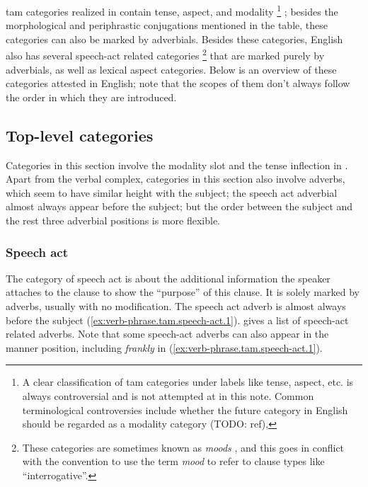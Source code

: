 \documentclass[UTF8, a4paper, oneside, scheme=plain, 12pt]{ctexbook}
\newcommand*{\citesec}[1]{\S~{#1}}
\newcommand*{\citechap}[1]{Ch.~{#1}}
\newcommand*{\term}[1]{\emph{#1}}
\newcommand{\form}[1]{\emph{#1}}
\begin{document}
\ac{tam} categories realized in  
contain tense, aspect, and modality%
\footnote{
    A clear classification of \ac{tam} categories under labels like tense, aspect, etc. 
    is always controversial and is not attempted at in this note.
    Common terminological controversies include 
    whether the future category in English 
    should be regarded as a modality category (TODO: ref),
}
; besides the morphological and periphrastic conjugations mentioned in the table,
these categories can also be marked by adverbials.
Besides these categories,
English also has several speech-act related categories%
\footnote{
    These categories are sometimes known as \term{moods} \citep{cinque1999adverbs},
    and this goes in conflict with 
    the convention to use the term \term{mood}
    to refer to clause types like ``interrogative''. 
}
that are marked purely by adverbials,
as well as lexical aspect categories.
Below is an overview of these categories attested in English;
note that the scopes of them don't always follow the order in which they are introduced.


\subsection{Top-level categories}

Categories in this section involve the 
modality slot and the tense inflection in .
Apart from the verbal complex,
categories in this section also involve adverbs,
which seem to have similar height 
with the subject; 
the speech act adverbial almost always appear before the subject;
but the order between the subject and the rest three adverbial positions 
is more flexible.

\subsubsection{Speech act}

The category of speech act 
is about the additional information the speaker attaches to the clause 
to show the ``purpose'' of this clause.
It is solely marked by adverbs,
usually with no modification.
The speech act adverb is almost always before the subject
(\ref{ex:verb-phrase.tam.speech-act.1}).
\citet[\citechap{8}, \citesec{18}]{cgel} gives a list of speech-act related adverbs.
Note that some speech-act adverbs 
can also appear in the manner position,
including \form{frankly} in (\ref{ex:verb-phrase.tam.speech-act.1}).
\end{document}
